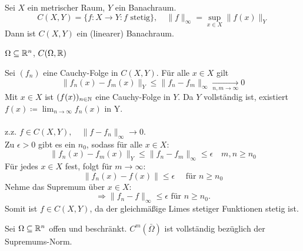 \begin{prop}
	Sei $X$ ein metrischer Raum, $Y$ ein Banachraum.
	\[ C(X, Y) = \{ f \colon X \rightarrow Y: f \text{ stetig} \}, \quad \| f \|_{\infty} = \sup_{x \in X} \| f(x) \|_{Y} \]
	Dann ist $C(X, Y)$ ein (linearer) Banachraum.
\end{prop}


\begin{beispiel*}
	$\Omega \subseteq \mathbb{R}^{n}$, $C(\Omega, \mathbb{R})$
\end{beispiel*}

\begin{beweis}
	Sei $(f_{n})$ eine Cauchy-Folge in $C(X, Y)$. Für alle $x \in X$ gilt
	\[ \| f_{n}(x) - f_{m}(x) \|_{Y} \leq \| f_{n} - f_{m} \|_{\infty} \xrightarrow[n, m \rightarrow \infty]{} 0 \]
	Mit $x \in X$ ist $(f(x))_{n \in \mathbb{N}}$ eine Cauchy-Folge in $Y$. Da $Y$ vollständig ist, existiert $f(x) \coloneqq \lim_{n \rightarrow \infty} f_{n}(x)$ in Y. \\ \\
	z.z. $f \in C(X, Y), \quad \| f - f_{n} \|_{\infty} \rightarrow 0$. \\
	Zu $\epsilon > 0$ gibt es ein $n_{0}$, sodass für alle $x \in X$:
		\[ \| f_{n}(x) - f_{m}(x) \|_{Y} \leq \| f_{n} - f_{m} \|_{\infty} \leq \epsilon \quad m, n \geq n_{0} \]
	Für jedes $x \in X$ fest, folgt für $m \rightarrow \infty$:
		\[ \| f_{n}(x) - f(x) \| \leq \epsilon \quad \text{ für } n \geq n_{0} \]
	Nehme das Supremum über $x \in X$:
		\[ \Rightarrow \| f_{n} - f \|_{\infty} \leq \epsilon \text{ für } n \geq n_{0}. 	\]	\newline
	Somit ist $f \in C(X, Y)$, da der gleichmä{\ss}ige Limes stetiger Funktionen stetig ist.
\end{beweis}


\begin{beispiel}
	Sei $\Omega \subseteq \mathbb{R}^{n}$ offen und beschränkt. $C^{m}(\bar \Omega)$ ist vollständig bezüglich der Supremums-Norm.	
\end{beispiel}

